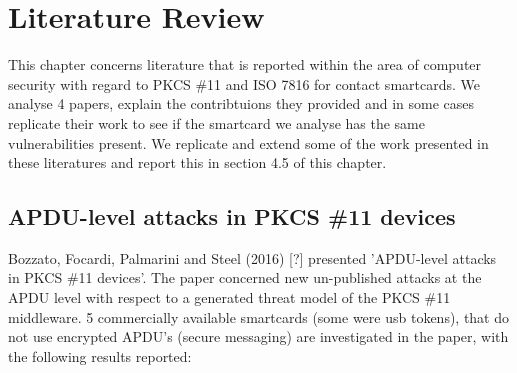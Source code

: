 \documentclass[bsc,frontabs,twoside,singlespacing,parskip,deptreport]{infthesis}     %
\begin{document}

\chapter{Literature Review}

This chapter concerns literature that is reported within the area of computer security with regard to PKCS \#11 and ISO 7816 for contact smartcards. We analyse 4 papers, explain the contribtuions they provided and in some cases replicate their work to see if the smartcard we analyse has the same vulnerabilities present. We replicate and extend some of the work presented in these literatures and report this in section 4.5 of this chapter.

\section{APDU-level attacks in PKCS \#11 devices}

Bozzato, Focardi, Palmarini and Steel (2016) [?] presented 'APDU-level attacks in PKCS \#11 devices'. The paper concerned new un-published attacks at the APDU level with respect to a generated threat model of the PKCS \#11 middleware. 5 commercially available smartcards (some were usb tokens), that do not use encrypted APDU's (secure messaging) are investigated in the paper, with the following results reported:
\end{document}
